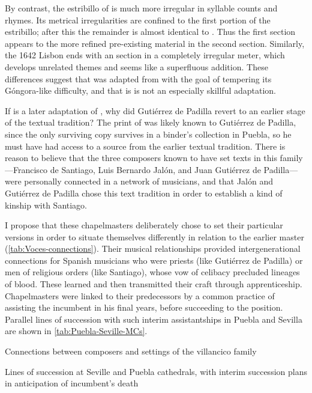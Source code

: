 By contrast, the estribillo of  is much more irregular in
syllable counts and rhymes.
Its metrical irregularities are confined to the first portion of the
estribillo; after this the remainder is almost identical to .
Thus the first section appears  to the more refined
pre-existing material in the second section.
Similarly, the 1642 Lisbon  ends with an  section in
a completely irregular meter, which develops unrelated themes and seems like a
superfluous addition.
These differences suggest that  was adapted from 
with the goal of tempering its Góngora-like difficulty, and that is is not an
especially skillful adaptation.

If  is a later adaptation of , why did Gutiérrez
de Padilla revert to an earlier stage of the textual tradition?
The print of  was likely known to Gutiérrez de Padilla, since
the only surviving copy survives in a binder's collection in Puebla, so he must
have had access to a source from the earlier textual tradition.
There is reason to believe that the three composers known to have set texts in
this family---Francisco de Santiago, Luis Bernardo Jalón, and Juan Gutiérrez de
Padilla---were personally connected in a network of musicians, and that Jalón
and Gutiérrez de Padilla chose this text tradition in order to establish a kind
of kinship with Santiago.

I propose that these chapelmasters deliberately chose to set their particular
versions in order to situate themselves differently in relation to the earlier
master (\cref{tab:Voces-connections}).
Their musical relationships provided intergenerational connections for Spanish
musicians who were priests (like Gutiérrez de Padilla) or men of religious orders
(like Santiago), whose vow of celibacy precluded lineages of blood. 
These  learned and then transmitted their craft through
apprenticeship.
Chapelmasters were linked to their predecessors by a common practice of
assisting the incumbent in his final years, before succeeding to the position.
Parallel lines of succession with such interim assistantships in Puebla and
Sevilla are shown in \cref{tab:Puebla-Seville-MCs}.

{Connections between composers and settings of the  villancico
family}

{Lines of succession at Seville and Puebla cathedrals, with interim succession
plans in anticipation of incumbent's death}

